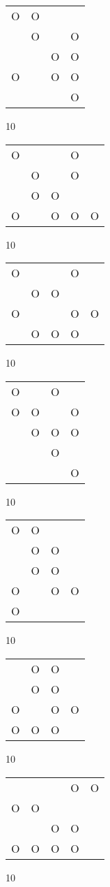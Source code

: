 \begin{tabular}{|m{0.2cm}m{0.2cm}m{0.2cm}m{0.2cm}|}\hline
O&O& & \\
 &O& &O\\
 & &O&O\\
O& &O&O\\
 & & &O\\
\hline\end{tabular}10
\begin{tabular}{|m{0.2cm}m{0.2cm}m{0.2cm}m{0.2cm}m{0.2cm}|}\hline
O& & &O& \\
 &O& &O& \\
 &O&O& & \\
O& &O&O&O\\
\hline\end{tabular}10
\begin{tabular}{|m{0.2cm}m{0.2cm}m{0.2cm}m{0.2cm}m{0.2cm}|}\hline
O& & &O& \\
 &O&O& & \\
O& & &O&O\\
 &O&O&O& \\
\hline\end{tabular}10
\begin{tabular}{|m{0.2cm}m{0.2cm}m{0.2cm}m{0.2cm}|}\hline
O& &O& \\
O&O& &O\\
 &O&O&O\\
 & &O& \\
 & & &O\\
\hline\end{tabular}10
\begin{tabular}{|m{0.2cm}m{0.2cm}m{0.2cm}m{0.2cm}|}\hline
O&O& & \\
 &O&O& \\
 &O&O& \\
O& &O&O\\
O& & & \\
\hline\end{tabular}10
\begin{tabular}{|m{0.2cm}m{0.2cm}m{0.2cm}m{0.2cm}|}\hline
 &O&O& \\
 &O&O& \\
O& &O&O\\
O&O&O& \\
\hline\end{tabular}10
\begin{tabular}{|m{0.2cm}m{0.2cm}m{0.2cm}m{0.2cm}m{0.2cm}|}\hline
 & & &O&O\\
O&O& & & \\
 & &O&O& \\
O&O&O&O& \\
\hline\end{tabular}10
